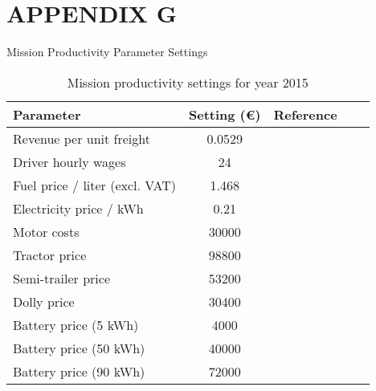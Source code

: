 \documentclass[ExampleMasters.tex]{subfiles}
\begin{document}
	\chapter{APPENDIX G}
	{\Large Mission Productivity Parameter Settings}

		\begin{table}[ht]
			\centering 
			\begin{tabular}{l c c c c}
	  			\hline
				Parameter & Setting (\euro) & Reference\\
				\hline
				\hline
				Revenue per unit freight & 0.0529 & \cite{EuAECOM2}\\
			    Driver hourly wages  & 24 & \cite{EuAECOM2}\\
			    Fuel price / liter (excl. VAT)  & 1.468  & \cite{EuAECOM2}\\
			    Electricity price / kWh  & 0.21 & \cite{EUelectricity}\\
			    Motor costs  & 30000 & \cite{EuPLot30Motors}\\
			    Tractor price & 98800 & \cite{FrostSullivan}\\
			    Semi-trailer price & 53200 & \cite{FrostSullivan}\\
			    Dolly price & 30400 & \cite{FrostSullivan}\\
			    Battery price (5 kWh) & 4000 & \cite{ElementEnergy}\\
			    Battery price (50 kWh) & 40000 & \cite{ElementEnergy}\\
			    Battery price (90 kWh) & 72000 & \cite{ElementEnergy}\\
			\hline 
			\end{tabular}
			\caption{Mission productivity settings for year 2015} 
			\label{table:MissionProdSet2015} 
		\end{table}
\end{document}
